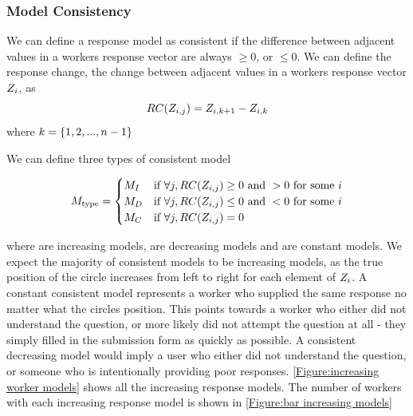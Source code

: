 

\subsubsection{Model Consistency}
We can define a response model as consistent if the difference between adjacent values in a workers response vector are always $\geqslant 0$, or $\leqslant 0$. 
We can define the response change, the change between adjacent values in a workers response vector $Z_i$, as
\[RC(Z_{i,j})=Z_{i,k+1}-Z_{i,k}\]
where $k=\lbrace 1,2,...,n -1 \rbrace $

We can define three types of consistent model 

\[
M_\text{type}=
\begin{cases}
M_I & \text{if } \forall j, RC(Z_{i,j}) \geq 0 \text{ and } >0 \text{ for some \ensuremath{i}} \\
M_D      & \text{if } \forall j, RC(Z_{i,j}) \leq 0 \text{ and } < 0 \text{ for some \ensuremath{i}}\\
M_C    & \text{if } \forall j, RC(Z_{i,j}) = 0 
 \end{cases}
\]

where \consInc are increasing models, \consDec are decreasing models and \consCon are constant models. 
We expect the majority of consistent models to be increasing models, as the true position of the circle increases from left to right for each element of $Z_i$. 
A constant consistent model represents a worker who supplied the same response no matter what the circles position. 
This points towards a worker who either did not understand the question, or more likely did not attempt the question at all - they simply filled in the submission form as quickly as possible. 
A consistent decreasing model would imply a user who either did not understand the question, or someone who is intentionally providing poor responses.
\ref{Figure:increasing worker models} shows all the increasing response models. The number of workers with each increasing response model is shown in \ref{Figure:bar increasing models}

